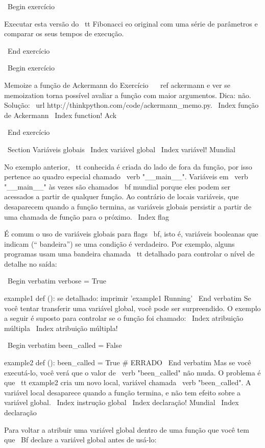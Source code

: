 \documentclass[10pt]{book}
\begin{document}
{{{{{{{\ Begin {} exercício

Executar esta versão do {\ tt Fibonacci} eo original com
uma série de parâmetros e comparar os seus tempos de execução.

\ End {} exercício

\ Begin {} exercício

Memoize a função de Ackermann do Exercício ~ \ ref {} ackermann e ver se
memoization torna possível avaliar a função com maior
argumentos. Dica: não.
Solução: \ url {http://thinkpython.com/code/ackermann_memo.py}.
\ Index {função de Ackermann}
\ Index {function! Ack}

\ End {} exercício


\ Section {Variáveis ​​globais}
\ Index {variável global}
\ Index {variável! Mundial}

No exemplo anterior, {\ tt conhecida} é criada do lado de fora da função,
por isso pertence ao quadro especial chamado \ verb "__main__".
Variáveis ​​em \ verb "__main__" às vezes são chamados {\ bf mundial}
porque eles podem ser acessados ​​a partir de qualquer função. Ao contrário de locais
variáveis, que desaparecem quando a função termina, as variáveis ​​globais
persistir a partir de uma chamada de função para o próximo.
\ Index {flag}

É comum o uso de variáveis ​​globais para {flags \ bf}, isto é, 
variáveis ​​booleanas que indicam (`` bandeira'') se uma condição
é verdadeiro. Por exemplo, alguns programas usam
uma bandeira chamada {\ tt detalhado} para controlar o nível de detalhe no
saída:

\ Begin {verbatim}
verbose = True

example1 def ():
    se detalhado:
        imprimir 'example1 Running'
\ End {verbatim}
%
Se você tentar transferir uma variável global, você pode ser surpreendido.
O exemplo a seguir é suposto para controlar se o
função foi chamado:
\ Index {atribuição múltipla}
\ Index {atribuição múltipla!}

\ Begin {verbatim}
been_called = False

example2 def ():
    been_called = True # ERRADO
\ End {verbatim}
%
Mas se você executá-lo, você verá que o valor de \ verb "been_called"
não muda. O problema é que {\ tt example2} cria um novo local,
variável chamada \ verb "been_called". A variável local desaparece quando
a função termina, e não tem efeito sobre a variável global.
\ Index {instrução global}
\ Index {declaração! Mundial}
\ Index {declaração}

Para voltar a atribuir uma variável global dentro de uma função que você tem que
{\ Bf} declare a variável global antes de usá-lo:

}}}}}}}
\end{document}
